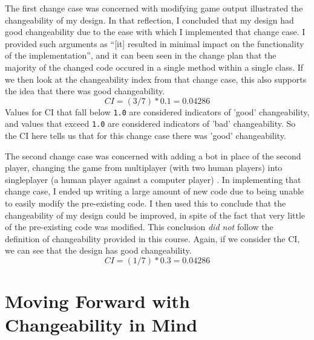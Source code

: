 \documentclass[10pt, a4paper, conference]{IEEEtran}
\begin{document}
The first change case was concerned with modifying game output
\cite{a4-change-case} illustrated the changeability of my design. In that
reflection, I concluded that my design had good changeability due to the ease
with which I implemented that change case. I provided such arguments as ``[it]
resulted in minimal impact on the functionality of the implementation'', and it
can been seen in the change plan that the majority of the changed code occured
in a single method within a single class. If we then look at the changeability
index from that change case, this also supports the idea that there was good
changeability.
\begin{equation}
  CI = (3 / 7) * 0.1 = 0.04286
\end{equation}
Values for CI that fall below \texttt{1.0} are considered indicators of 'good'
changeability, and values that exceed \texttt{1.0} are considered indicators of
'bad' changeability. So the CI here tells us that for this change case there
was 'good' changeability. 

The second change case was concerned with adding a bot in place of the second
player, changing the game from multiplayer (with two human players) into
singleplayer (a human player against a computer player) \cite{a5-change-case}.
In implementing that change case, I ended up writing a large amount of new code
due to being unable to easily modify the pre-existing code. I then used this to
conclude that the changeability of my design could be improved, in spite of the
fact that very little of the pre-existing code was modified. This conclusion
\textit{did not} follow the definition of changeability provided in this
course. Again, if we consider the CI, we can see that the design has good
changeability.
\begin{equation}
  CI = (1 / 7) * 0.3 = 0.04286
\end{equation}


\section{Moving Forward with Changeability in Mind}
\end{document}
